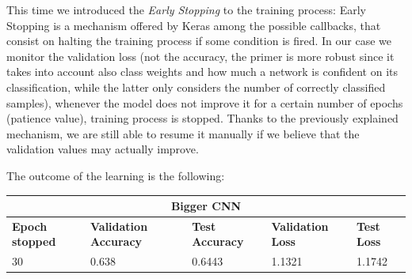 \noindent This time we introduced the \textit{Early Stopping} to the training process: Early Stopping is a mechanism offered by Keras among the possible callbacks, that consist on halting the training process if some condition is fired. In our case we monitor the validation loss (not the accuracy, the primer is more robust since it takes into account also class weights and how much a network is confident on its classification, while the latter only considers the number of correctly classified samples), whenever the model does not improve it for a certain number of epochs (patience value), training process is stopped. Thanks to the previously explained mechanism, we are still able to resume it manually if we believe that the validation values may actually improve.

\noindent The outcome of the learning is the following:

\medskip

\begin{tabular}{ |p{2cm}|p{2cm}|p{2cm}|p{2cm}|p{2cm}|  }
\hline
\multicolumn{5}{|c|}{Bigger CNN} \\
\hline
\textbf{Epoch stopped} & \textbf{Validation Accuracy} & \textbf{Test Accuracy} & \textbf{Validation Loss} & \textbf{Test Loss} \\
\hline
30 & 0.638 & 0.6443 & 1.1321 & 1.1742\\
\hline
\end{tabular}

\medskip


